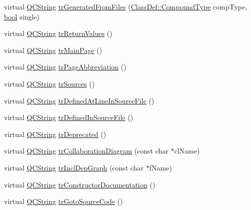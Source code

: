 \begin{DoxyCompactItemize}
\item 
virtual \hyperlink{class_q_c_string}{Q\+C\+String} \hyperlink{class_translator_arabic_ab6b9b20ba86764e71700e42c1fe12946}{tr\+Generated\+From\+Files} (\hyperlink{class_class_def_ae70cf86d35fe954a94c566fbcfc87939}{Class\+Def\+::\+Compound\+Type} comp\+Type, \hyperlink{qglobal_8h_a1062901a7428fdd9c7f180f5e01ea056}{bool} single)
\item 
virtual \hyperlink{class_q_c_string}{Q\+C\+String} \hyperlink{class_translator_arabic_adfcbf3e24fe5eaedd86fbfddbdcb7e42}{tr\+Return\+Values} ()
\item 
virtual \hyperlink{class_q_c_string}{Q\+C\+String} \hyperlink{class_translator_arabic_a593eb2a9c452c8e2eb1c59b39cd9ddb7}{tr\+Main\+Page} ()
\item 
virtual \hyperlink{class_q_c_string}{Q\+C\+String} \hyperlink{class_translator_arabic_a3f633770ce93f1d2b3a1fc2fbd375101}{tr\+Page\+Abbreviation} ()
\item 
virtual \hyperlink{class_q_c_string}{Q\+C\+String} \hyperlink{class_translator_arabic_ae2fcf278dd6cc87d179f1af0f5511cf3}{tr\+Sources} ()
\item 
virtual \hyperlink{class_q_c_string}{Q\+C\+String} \hyperlink{class_translator_arabic_abcab840608ff6adca64d294666924f12}{tr\+Defined\+At\+Line\+In\+Source\+File} ()
\item 
virtual \hyperlink{class_q_c_string}{Q\+C\+String} \hyperlink{class_translator_arabic_aa33a2d030623092fd2ac8b1a3ef3dd15}{tr\+Defined\+In\+Source\+File} ()
\item 
virtual \hyperlink{class_q_c_string}{Q\+C\+String} \hyperlink{class_translator_arabic_af669b579785efebe5da822b73ef38d19}{tr\+Deprecated} ()
\item 
virtual \hyperlink{class_q_c_string}{Q\+C\+String} \hyperlink{class_translator_arabic_a6ca15143ebd2361a7b1245e5c5efca8c}{tr\+Collaboration\+Diagram} (const char $\ast$cl\+Name)
\item 
virtual \hyperlink{class_q_c_string}{Q\+C\+String} \hyperlink{class_translator_arabic_aaa2e9d86d62c6d0c529a4e4674ee93b0}{tr\+Incl\+Dep\+Graph} (const char $\ast$f\+Name)
\item 
virtual \hyperlink{class_q_c_string}{Q\+C\+String} \hyperlink{class_translator_arabic_af0b71c62bd906419d092565d64546aff}{tr\+Constructor\+Documentation} ()
\item 
virtual \hyperlink{class_q_c_string}{Q\+C\+String} \hyperlink{class_translator_arabic_af6dd093850dd0c255d7421b6063d79ca}{tr\+Goto\+Source\+Code} ()
\item 

\end{DoxyCompactItemize}
